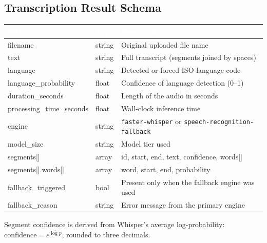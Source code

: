 \documentclass[11pt,a4paper]{article}
\newcommand{\thc}[1]{\textcolor{white}{\bfseries #1}}
\newcommand{\headrow}{\rowcolor{headblue}}
\begin{document}
\subsection{Transcription Result Schema}
\begin{tabularx}{\textwidth}{|L{4.2cm}|L{2.4cm}|Y|}
\hline
\headrow \thc{Field} & \thc{Type} & \thc{Description} \\ \hline
filename & string & Original uploaded file name \\ \hline
text & string & Full transcript (segments joined by spaces) \\ \hline
language & string & Detected or forced ISO language code \\ \hline
language\_probability & float & Confidence of language detection (0--1) \\ \hline
duration\_seconds & float & Length of the audio in seconds \\ \hline
processing\_time\_seconds & float & Wall-clock inference time \\ \hline
engine & string & \texttt{faster-whisper} or \texttt{speech-recognition-fallback} \\ \hline
model\_size & string & Model tier used \\ \hline
segments[] & array & id, start, end, text, confidence, words[] \\ \hline
segments[].words[] & array & word, start, end, probability \\ \hline
fallback\_triggered & bool & Present only when the fallback engine was used \\ \hline
fallback\_reason & string & Error message from the primary engine \\ \hline
\end{tabularx}

Segment confidence is derived from Whisper's average log-probability: $\text{confidence} = e^{\overline{\log p}}$, rounded to three decimals.

\end{document}
